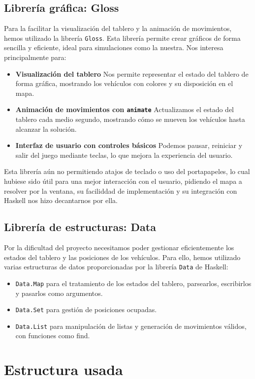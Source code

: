 \documentclass{article}
\begin{document}
\subsection*{Librería gráfica: Gloss}
Para la facilitar la visualización del tablero y la animación de movimientos, hemos utilizado la librería \texttt{Gloss}. Esta librería permite crear gráficos de forma sencilla y eficiente, ideal para simulaciones como la nuestra. Nos interesa principalmente para:
\begin{itemize}
\item \textbf{Visualización del tablero} Nos permite representar el estado del tablero de forma gráfica, mostrando los vehículos con colores y su disposición en el mapa.
\item \textbf{Animación de movimientos con \texttt{animate}} Actualizamos el estado del tablero cada medio segundo, mostrando cómo se mueven los vehículos hasta alcanzar la solución.
\item \textbf{Interfaz de usuario con controles básicos} Podemos pausar, reiniciar y salir del juego mediante teclas, lo que mejora la experiencia del usuario.
\end{itemize}
Esta librería aún no permitiendo atajos de teclado o uso del portapapeles, lo cual hubiese sido útil para una mejor interacción con el usuario, pidiendo el mapa a resolver por la ventana, su faciliddad de implementación y su integración con Haskell nos hizo decantarnos por ella.

\subsection*{Librería de estructuras: Data}
Por la dificultad del proyecto necesitamos poder gestionar eficientemente los estados del tablero y las posiciones de los vehículos. Para ello, hemos utilizado varias estructuras de datos proporcionadas por la librería \texttt{Data} de Haskell:
\begin{itemize}
\item \texttt{Data.Map} para el tratamiento de los estados del tablero, parsearlos, escribirlos y pasarlos como argumentos.
\item \texttt{Data.Set} para gestión de posiciones ocupadas.
\item \texttt{Data.List} para manipulación de listas y generación de movimientos válidos, con funciones como find.
\end{itemize}

\section*{Estructura usada}
\end{document}
